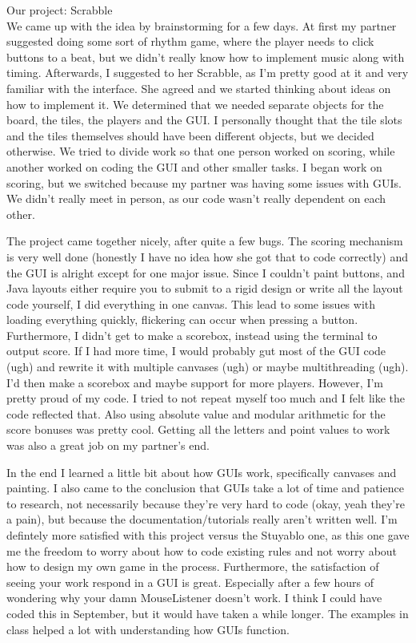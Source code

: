 \documentclass[12pt]{article}
\begin{document}
Our project: Scrabble \\
We came up with the idea by brainstorming for a few days. At first my partner suggested doing some sort of rhythm game, where the player needs to click buttons to a beat, but we didn't really know how to implement music along with timing. Afterwards, I suggested to her Scrabble, as I'm pretty good at it and very familiar with the interface. She agreed and we started thinking about ideas on how to implement it. We determined that we needed separate objects for the board, the tiles, the players and the GUI. I personally thought that the tile slots and the tiles themselves should have been different objects, but we decided otherwise. We tried to divide work so that one person worked on scoring, while another worked on coding the GUI and other smaller tasks. I began work on scoring, but we switched because my partner was having some issues with GUIs. We didn't really meet in person, as our code wasn't really dependent on each other. 

The project came together nicely, after quite a few bugs. The scoring mechanism is very well done (honestly I have no idea how she got that to code correctly) and the GUI is alright except for one major issue. Since I couldn't paint buttons, and Java layouts either require you to submit to a rigid design or write all the layout code yourself, I did everything in one canvas. This lead to some issues with loading everything quickly, flickering can occur when pressing a button. Furthermore, I didn't get to make a scorebox, instead using the terminal to output score. If I had more time, I would probably gut most of the GUI code (ugh) and rewrite it with multiple canvases (ugh) or maybe multithreading (ugh). I'd then make a scorebox and maybe support for more players. However, I'm pretty proud of my code. I tried to not repeat myself too much and I felt like the code reflected that. Also using absolute value and modular arithmetic for the score bonuses was pretty cool. Getting all the letters and point values to work was also a great job on my partner's end.

 In the end I learned a little bit about how GUIs work, specifically canvases and painting. I also came to the conclusion that GUIs take a lot of time and patience to research, not necessarily because they're very hard to code (okay, yeah they're a pain), but because the documentation/tutorials really aren't written well. I'm defintely more satisfied with this project versus the Stuyablo one, as this one gave me the freedom to worry about how to code existing rules and not worry about how to design my own game in the process. Furthermore, the satisfaction of seeing your work respond in a GUI is great. Especially after a few hours of wondering why your damn MouseListener doesn't work. I think I could have coded this in September, but it would have taken a while longer. The examples in class helped a lot with understanding how GUIs function. 
\end{document}
